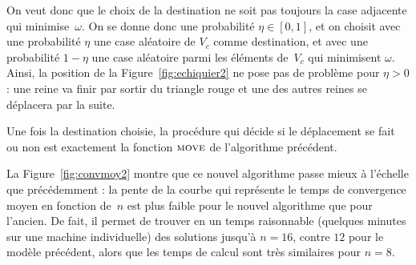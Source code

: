 
On veut donc que le choix de la destination ne soit pas toujours la case adjacente qui minimise~$\omega$. On se donne donc une probabilité $\eta \in [0,1]$, et on choisit avec une probabilité $\eta$ une case aléatoire de $V_c$ comme destination, et avec une probabilité $1 - \eta$ une case aléatoire parmi les éléments de~$V_c$ qui minimisent $\omega$. Ainsi, la position de la Figure~\ref{fig:echiquier2} ne pose pas de problème pour $\eta > 0$ : une reine va finir par sortir du triangle rouge et une des autres reines se déplacera par la suite.

Une fois la destination choisie, la procédure qui décide si le déplacement se fait ou non est exactement la fonction $\textsc{move}$ de l'algorithme précédent.



        
    

La  Figure~\ref{fig:convmoy2} montre  que  ce nouvel  algorithme  passe mieux  à
l'échelle que  précédemment : la pente de  la courbe qui représente  le temps de
convergence moyen en  fonction de~$n$ est plus faible  pour le nouvel algorithme
que  pour l'ancien.  De  fait, il  permet  de trouver  en  un temps  raisonnable
(quelques minutes  sur une machine  individuelle) des solutions  jusqu'à $n=16$,
contre $12$  pour le modèle précédent, alors  que les temps de  calcul sont très
similaires pour $n=8$. 


